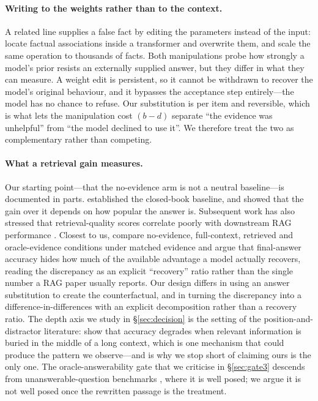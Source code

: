 \documentclass[11pt]{article}
\begin{document}
\paragraph{Writing to the weights rather than to the context.}
A related line supplies a false fact by editing the parameters instead of the input:
\citet{meng2022rome} locate factual associations inside a transformer and overwrite them,
and \citet{meng2023memit} scale the same operation to thousands of facts. Both
manipulations probe how strongly a model's prior resists an
externally supplied answer, but they differ in what they can measure. A weight edit is
persistent, so it cannot be withdrawn to recover the model's original behaviour, and it
bypasses the acceptance step entirely---the model has no chance to refuse. Our
substitution is per item and reversible, which is what lets the manipulation cost
$(b-d)$ separate ``the evidence was unhelpful'' from ``the model declined to use it''.
We therefore treat the two as complementary rather than competing.

\paragraph{What a retrieval gain measures.}
Our starting point---that the no-evidence arm is not a neutral baseline---is documented
in parts. \citet{roberts2020} established the closed-book baseline, and \citet{mallen2023}
showed that the gain over it depends on how popular the answer is. Subsequent work has
also stressed that retrieval-quality scores correlate poorly with downstream {RAG}
performance \citep{salemi2024erag}. Closest to us, \citet{xia2026evidence} compare
no-evidence, full-context, retrieved and oracle-evidence conditions under matched evidence
and argue that final-answer accuracy hides how much of the available advantage a model
actually recovers, reading the discrepancy as an explicit ``recovery'' ratio rather than
the single number a {RAG} paper usually reports. Our design differs in using an answer substitution
to create the counterfactual, and in turning the discrepancy into a difference-in-differences
with an explicit decomposition rather than a recovery ratio. The depth axis we study in
\S\ref{sec:decision} is the setting of the position-and-distractor literature:
\citet{liu2024lost} show that accuracy degrades when
relevant information is buried in the middle of a long context, which is one mechanism that
could produce the pattern we observe---and is why we stop short of claiming ours is the
only one. The oracle-answerability gate that we criticise in \S\ref{sec:gate3} descends from
unanswerable-question benchmarks \citep{rajpurkar2018squad2}, where it is well posed; we
argue it is not well posed once the rewritten passage is the treatment.
\end{document}
